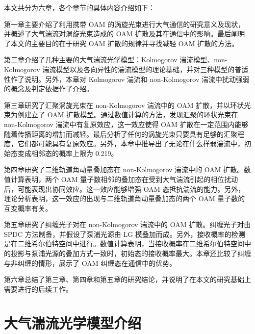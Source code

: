 \documentclass[master]{thesis-uestc}
\begin{document}
本文共分为六章，各个章节的具体内容介绍如下：

第一章主要介绍了利用携带 OAM 的涡旋光束进行大气通信的研究意义及现状，并概述了大气湍流对涡旋光束造成的 OAM 扩散及其在通信中的影响。最后阐明了本文的主要目的在于研究 OAM 扩散的规律并寻找减轻 OAM 扩散的方法。

第二章介绍了几种主要的大气湍流光学模型：Kolmogorov 湍流模型、non-Kolmogorov 湍流模型以及各向异性的湍流模型的理论基础，并对三种模型的普适性作了说明。另外，本章对 Kolmogorov 湍流和 non-Kolmogorov 湍流中扰动强弱的概念及判定依据作了介绍。

第三章研究了汇聚涡旋光束在 non-Kolmogorov 湍流中的 OAM 扩散，并以环状光束为例建立了 OAM 扩散模型。通过数值计算的方法，发现汇聚的环状光束在 non-Kolmogorov 湍流中有复原效应，这一效应使得 OAM 扩散在一定范围内能够随着传播距离的增加而减轻。最后分析了任何的涡旋光束只要具有足够的汇聚程度，它们都可能具有复原效应。另外，本章中推导出了无论在什么样弱湍流中，初始态变成相邻态的概率上限为 0.219。

第四章研究了二维轨道角动量叠加态在 non-Kolmogorov 湍流中的 OAM 扩散。数值计算表明，两个 OAM 量子数相邻的叠加态在受到大气湍流引起的相位扰动后，可能表现出协同效应。这一效应能够增强 OAM 态抵抗湍流的能力。另外，理论分析表明，这一效应的出现与二维轨道角动量叠加态的两个 OAM 量子数的互变概率有关。

第五章研究了纠缠光子对在 non-Kolmogorov 湍流中的 OAM 扩散。纠缠光子对由 SPDC 方法制备，并假设了泵浦光源由 LG 模叠加而成。另外，接收概率的检测是在二维希尔伯特空间中进行。数值计算表明，当接收概率在二维希尔伯特空间中的投影与泵浦光源的叠加方式一致时，初始态的接收概率最大。本章还比较了纠缠与非纠缠的情形，展示了 OAM 纠缠态在通信中的优势。

第六章总结了第三章、第四章和第五章的研究结论，并说明了在本文的研究基础上需要进行的后续工作。



\chapter{大气湍流光学模型介绍}
\end{document}

